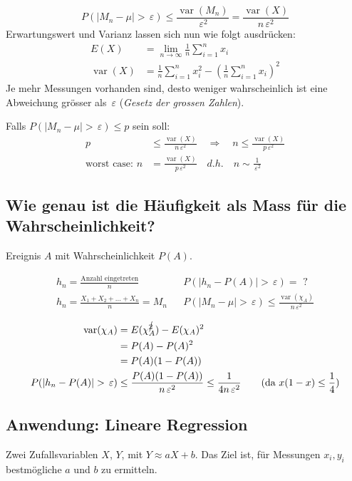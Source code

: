 \documentclass[10pt,a4paper]{scrartcl}
\DeclareMathOperator{\var}{var}
\begin{document}
$$ P(|M_n - \mu| > \,\varepsilon) \le \frac{\var(M_n)}{\,\varepsilon^2} = \frac{\var(X)}{n\,\varepsilon^2} $$
Erwartungswert und Varianz lassen sich nun wie folgt ausdrücken:
\begin{align*}
E(X) & = \lim_{n\to\infty} \frac{1}{n} \sum_{i=1}^n x_i \\
\var(X) & = \frac{1}{n} \sum_{i=1}^n x_i^2 - \left(\frac{1}{n} \sum_{i=1}^n x_i\right)^2
\end{align*}
Je mehr Messungen vorhanden sind, desto weniger wahrscheinlich ist eine Abweichung grösser als $\,\varepsilon$ (\emph{Gesetz der grossen Zahlen}).

Falls $P(|M_n - \mu| > \,\varepsilon) \le p$ sein soll:
\begin{align*}
  p & \le \frac{\var(X)}{n\,\varepsilon^2} \quad\Rightarrow\quad
  n \le \frac{\var(X)}{p\,\varepsilon^2} \\
  \text{worst case: } n &= \frac{\var(X)}{p\,\varepsilon^2} \quad {d.h.}\quad n \sim \frac{1}{\,\varepsilon^2}
\end{align*}

\subsection{Wie genau ist die Häufigkeit als Mass für die Wahrscheinlichkeit?}
Ereignis $A$ mit Wahrscheinlichkeit $P(A)$.

\begin{align*}
  h_n = \frac{\text{Anzahl eingetreten}}{n} & & P(|h_n - P(A)| > \,\varepsilon) =\text{ ?} \\%
h_n = \frac{X_1 + X_2 + \dots + X_n}{n} = M_n& & P(|M_n - \mu| > \,\varepsilon) \le \frac{\var(\chi_A)}{n\,\varepsilon^2} 
\end{align*}

\begin{align*}
\var(\chi_A) & = E(\chi_A^{\cancel{2}}) - E(\chi_A)^2 \\
& = P(A) - P(A)^2 \\
& = P(A) (1 - P(A)) \\
P(|h_n - P(A)| > \,\varepsilon) & \le \frac{P(A)(1-P(A))}{n\,\varepsilon^2} \le \frac{1}{4n\,\varepsilon^2} \qquad(\text{da } x(1-x) \le \frac{1}{4})
\end{align*}

\subsection{Anwendung: Lineare Regression}
Zwei Zufallsvariablen $X$, $Y$, mit $Y\approx aX+b$. Das Ziel ist, für Messungen $x_i, y_i$ bestmögliche $a$ und $b$ zu ermitteln.
\end{document}
